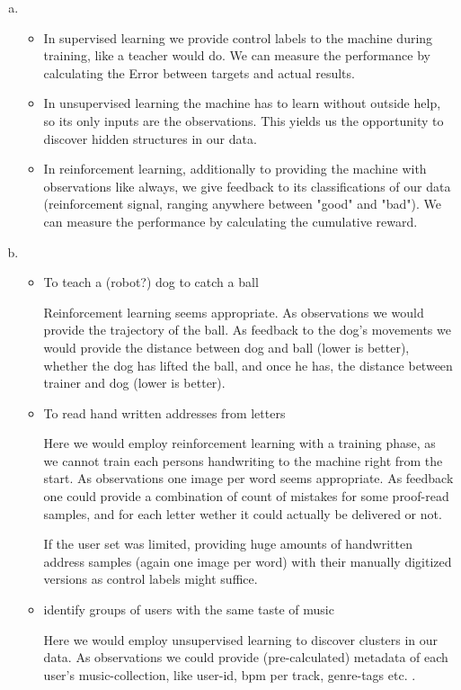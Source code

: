 \documentclass[11pt,a4paper]{article}
\begin{document}
\begin{enumerate}[a)]

\item \begin{itemize}

\item In supervised learning we provide control labels to the machine during training, like a teacher would do. We can measure the performance by calculating the Error between targets and actual results.

\item In unsupervised learning the machine has to learn without outside help, so its only inputs are the observations. This yields us the opportunity to discover hidden structures in our data.

\item In reinforcement learning, additionally to providing the machine with observations like always, we give feedback to its classifications of our data (reinforcement signal, ranging anywhere between "good" and "bad"). We can measure the performance by calculating the cumulative reward.

\end{itemize}

\item \begin{itemize}
\item To teach a (robot?) dog to catch a ball

Reinforcement learning seems appropriate. As observations we would provide the trajectory of the ball. As feedback to the dog's movements we would provide the distance between dog and ball (lower is better), whether the dog has lifted the ball, and once he has, the distance between trainer and dog (lower is better).

\item To read hand written addresses from letters

Here we would employ reinforcement learning with a training phase, as we cannot train each persons handwriting to the machine right from the start. As observations one image per word seems appropriate. As feedback one could provide a combination of count of mistakes for some proof-read samples, and for each letter wether it could actually be delivered or not.

If the user set was limited, providing huge amounts of handwritten address samples (again one image per word) with their manually digitized versions as control labels might suffice.

\item identify groups of users with the same taste of music

Here we would employ unsupervised learning to discover clusters in our data. As observations we could provide (pre-calculated) metadata of each user's music-collection, like user-id, bpm per track, genre-tags etc. .
\end{itemize}

\end{enumerate}
\end{document}
